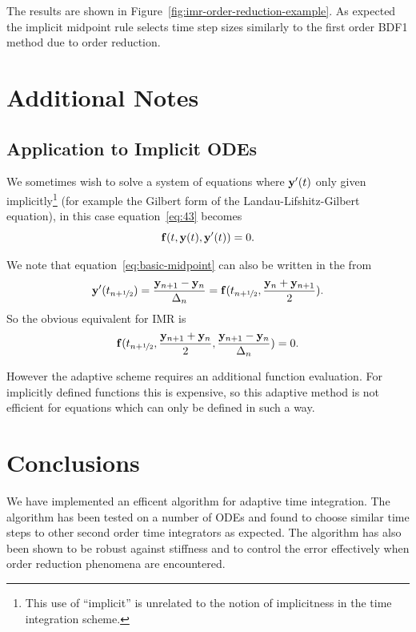 The results are shown in Figure~\ref{fig:imr-order-reduction-example}. 
As expected the implicit midpoint rule selects time step sizes similarly to the first order BDF1 method due to order reduction.


\section{Additional Notes}

\subsection{Application to Implicit ODEs}
\label{sec:extens-impl-odes}

We sometimes wish to solve a system of equations where $\mathbf{y}'(t)$ only given implicitly\footnote{This use of ``implicit'' is unrelated to the notion of implicitness in the time integration scheme.} (for example the Gilbert form of the Landau-Lifshitz-Gilbert equation), in this case equation~\eqref{eq:43} becomes
\begin{equation}
  {\mathbf{f}}(t, \mathbf{y}(t), \mathbf{y}'(t)) = 0.
\end{equation}

We note that equation~\eqref{eq:basic-midpoint} can also be written in the from
\begin{equation}
  \mathbf{y}'(t_{n+\nicefrac{1}{2}}) = \frac{\mathbf{y}_{n+1} - \mathbf{y}_n}{\Delta_{n}} =  {\mathbf{f}}(t_{n+\nicefrac{1}{2}}, \frac{\mathbf{y}_n + \mathbf{y}_{n+1}}{2}).
\end{equation}
So the obvious equivalent for IMR is
\begin{equation}
  {\mathbf{f}}(t_{n+\nicefrac{1}{2}}, \frac{\mathbf{y}_{n+1} + \mathbf{y}_n}{2}, \frac{\mathbf{y}_{n+1} - \mathbf{y}_n}{\Delta_{n}}) = 0.
\end{equation}

However the adaptive scheme requires an additional function evaluation.
For implicitly defined functions this is expensive, so this adaptive method is not efficient for equations which can only be defined in such a way.



\section{Conclusions}

We have implemented an efficent algorithm for adaptive time integration.
The algorithm has been tested on a number of ODEs and found to choose similar time steps to other second order time integrators as expected.
The algorithm has also been shown to be robust against stiffness and to control the error effectively when order reduction phenomena are encountered.


